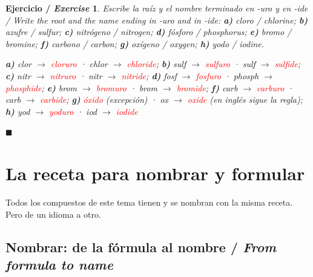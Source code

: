 \documentclass[12pt]{article}
\theoremstyle{mygreennumbox}
\newtheorem{ejercicioT}{Ejercicio / \textit{Exercise}}[section]
\newenvironment{exercise}{\begin{eBoxmygreen}\begin{ejercicioT}}{\hfill{\color{mygreen}\tiny\ensuremath{\blacksquare}}\end{ejercicioT}\end{eBoxmygreen}}
\newcommand{\en}[1]{\textit{#1}}
\begin{document}
\begin{exercise}
    Escribe la raíz y el nombre terminado en -uro y en \en{-ide} / \en{Write the root and the name ending in -uro and in -ide}: \textbf{a)} cloro / \en{chlorine}; \textbf{b)} azufre / \en{sulfur}; \textbf{c)} nitrógeno / \en{nitrogen}; \textbf{d)} fósforo / \en{phosphorus}; \textbf{e)} bromo / \en{bromine}; \textbf{f)} carbono / \en{carbon}; \textbf{g)} oxígeno / \en{oxygen}; \textbf{h)} yodo / \en{iodine}.
    \begin{solu}
        \textbf{a)} clor \(\to\) \textcolor{red}{cloruro} · \en{chlor} \(\to\) \textcolor{red}{\en{chloride}}; \textbf{b)} sulf \(\to\) \textcolor{red}{sulfuro} · \en{sulf} \(\to\) \textcolor{red}{\en{sulfide}}; \textbf{c)} nitr \(\to\) \textcolor{red}{nitruro} · \en{nitr} \(\to\) \textcolor{red}{\en{nitride}}; \textbf{d)} fosf \(\to\) \textcolor{red}{fosfuro} · \en{phosph} \(\to\) \textcolor{red}{\en{phosphide}}; \textbf{e)} brom \(\to\) \textcolor{red}{bromuro} · \en{brom} \(\to\) \textcolor{red}{\en{bromide}}; \textbf{f)} carb \(\to\) \textcolor{red}{carburo} · \en{carb} \(\to\) \textcolor{red}{\en{carbide}}; \textbf{g)} \textcolor{red}{óxido} (excepción) · \en{ox} \(\to\) \textcolor{red}{\en{oxide}} (en inglés sigue la regla); \textbf{h)} yod \(\to\) \textcolor{red}{yoduro} · \en{iod} \(\to\) \textcolor{red}{\en{iodide}}
    \end{solu}
\end{exercise}

\section{La receta para nombrar y formular}

Todos los compuestos de este tema tienen  y se nombran con la misma receta. Pero  de un idioma a otro.

\subsection{Nombrar: de la fórmula al nombre / \en{From formula to name}}
\end{document}

